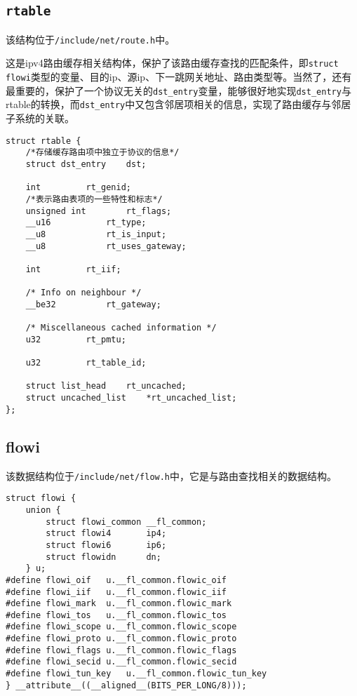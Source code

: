         \subsection{\texttt{rtable}}

            该结构位于\texttt{/include/net/route.h}中。

            这是ipv4路由缓存相关结构体，保护了该路由缓存查找的匹配条件，即\texttt{struct flowi}类型的变量、目的ip、源ip、下一跳网关地址、路由类型等。当然了，还有最重要的，保护了一个协议无关的\texttt{dst_entry}变量，能够很好地实现\texttt{dst_entry}与rtable的转换，而\texttt{dst_entry}中又包含邻居项相关的信息，实现了路由缓存与邻居子系统的关联。

\begin{verbatim}
struct rtable {
    /*存储缓存路由项中独立于协议的信息*/
    struct dst_entry    dst;        

    int         rt_genid;
    /*表示路由表项的一些特性和标志*/
    unsigned int        rt_flags;
    __u16           rt_type;
    __u8            rt_is_input;
    __u8            rt_uses_gateway;

    int         rt_iif;

    /* Info on neighbour */
    __be32          rt_gateway;

    /* Miscellaneous cached information */
    u32         rt_pmtu;

    u32         rt_table_id;

    struct list_head    rt_uncached;
    struct uncached_list    *rt_uncached_list;
};
\end{verbatim}

        \subsection{flowi}

            该数据结构位于\texttt{/include/net/flow.h}中，它是与路由查找相关的数据结构。
\begin{verbatim}
struct flowi {
    union {
        struct flowi_common __fl_common;
        struct flowi4       ip4;
        struct flowi6       ip6;
        struct flowidn      dn;
    } u;
#define flowi_oif   u.__fl_common.flowic_oif
#define flowi_iif   u.__fl_common.flowic_iif
#define flowi_mark  u.__fl_common.flowic_mark
#define flowi_tos   u.__fl_common.flowic_tos
#define flowi_scope u.__fl_common.flowic_scope
#define flowi_proto u.__fl_common.flowic_proto
#define flowi_flags u.__fl_common.flowic_flags
#define flowi_secid u.__fl_common.flowic_secid
#define flowi_tun_key   u.__fl_common.flowic_tun_key
} __attribute__((__aligned__(BITS_PER_LONG/8)));
\end{verbatim}
